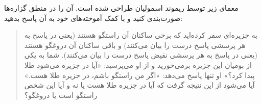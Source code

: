 معمای زیر توسط ریموند اسمولیان طراحی شده است. آن را در منطق گزاره‌ها صورت‌بندی کنید و با کمک آموخته‌های خود به آن پاسخ بدهید:
\begin{quote}
به جزیره‌ای سفر کرده‌اید که برخی ساکنان آن راستگو هستند (یعنی در پاسخ به هر پرسشی پاسخ درست را بیان می‌کنند) و باقی ساکنان آن دروغگو هستند (یعنی در پاسخ به هر پرسشی نقیض پاسخ درست را بیان می‌کنند). شما به یکی از بومیان این جزیره برمی‌خورید و از او می‌پرسید: «آیا در جزیره می‌شود طلا پیدا کرد؟» او تنها پاسخ می‌دهد: «اگر من راستگو باشم، در جزیره طلا هست.» آیا می‌شود از این نتیجه گرفت که آیا در جزیره طلا هست یا نه و آیا این شخص راستگو است یا دروغگو؟
\end{quote}
